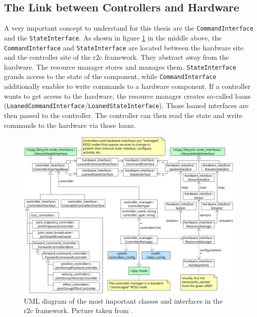 \subsection{The Link between Controllers and Hardware}\label{c3_sec_link_ctrl_hw}
A very important concept to understand for this thesis are the \texttt{CommandInterface} and the \texttt{StateInterface}. As shown in figure \ref{c3_fig_ros2_control_uml} in the middle above, the \texttt{CommandInterface} and \texttt{StateInterface} are located between the hardware site and the controller site of the \gls{r2c} framework. They abstract away from the hardware. The resource manager stores and manages them. \texttt{StateInterface} grands access to the state of the component, while \texttt{CommandInterface} additionally enables to write commands to a hardware component. If a controller wants to get access to the hardware, the resource manager creates so-called loans (\texttt{LoanedCommandInterface}/\texttt{LoanedStateInterface}). Those loaned interfaces are then passed to the controller. The controller can then read the state and write commands to the hardware via those loans.
\begin{figure}[htbp]
	\centering
	\includegraphics[width=1\textwidth]{Figures/c3/ros2_control_uml.png}
	\caption{UML diagram of the most important classes and interfaces in the \gls{r2c} framework. Picture taken from \cite{noauthor_welcome_nodate}. }
	\label{c3_fig_ros2_control_uml}
\end{figure}
 
